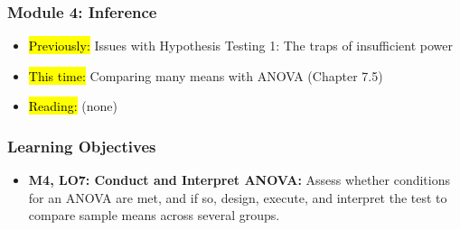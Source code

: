 
\begin{frame}
    \frametitle{Module 4: Inference}
    \begin{itemize}
        \item \hl{Previously: }Issues with Hypothesis Testing 1: The traps of insufficient power
        \item \hl{This time: }Comparing many means with ANOVA (Chapter 7.5)
        \item \hl{Reading: }(none)
    \end{itemize}

\end{frame}
\begin{frame}
    \frametitle{Learning Objectives}
    \begin{itemize}
        \item \textbf{M4, LO7: Conduct and Interpret ANOVA:} Assess whether conditions for an ANOVA are met, and if so, design, execute, and interpret the test to compare sample means across several groups.
    \end{itemize}
\end{frame}
